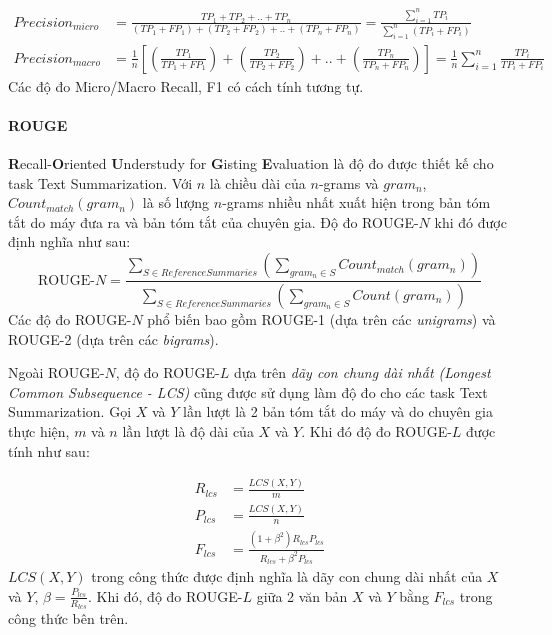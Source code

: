 \begin{equation}
\begin{aligned}
Precision_{micro} &= \frac{TP_1 + TP_2 + .. + TP_n}{(TP_1 + FP_1) + (TP_2 + FP_2) + .. + (TP_n + FP_n)} = \frac{\displaystyle\sum_{i = 1}^n TP_i}{\displaystyle\sum_{i = 1}^n (TP_i + FP_i)} \\
Precision_{macro} &= \frac{1}{n}\left[\left(\frac{TP_1}{TP_1 + FP_1}\right) + \left(\frac{TP_2}{TP_2 + FP_2}\right) + .. + \left(\frac{TP_n}{TP_n + FP_n}\right)\right] = \frac{1}{n}\sum_{i = 1}^n \frac{TP_i}{TP_i + FP_i}
\end{aligned}
\end{equation}
Các độ đo Micro/Macro Recall, F1 có cách tính tương tự.

\paragraph{ROUGE}
\textbf{R}ecall-\textbf{O}riented \textbf{U}nderstudy for \textbf{G}isting \textbf{E}valuation\cite{lin-2004-rouge} là độ đo được thiết kế cho task Text Summarization. Với $n$ là chiều dài của $n$-grams và $gram_n$, $Count_{match}(gram_n)$ là số lượng $n$-grams nhiều nhất xuất hiện trong bản tóm tắt do máy đưa ra và bản tóm tắt của chuyên gia. Độ đo ROUGE-$N$ khi đó được định nghĩa như sau:
\begin{equation}
\text{ROUGE-}N = \frac{\displaystyle\sum_{S \in {ReferenceSummaries}}\left(\sum_{gram_n \in S}Count_{match}(gram_n)\right)}{\displaystyle\sum_{S \in {ReferenceSummaries}}\left(\sum_{gram_n \in S}Count(gram_n)\right)}
\end{equation}
Các độ đo ROUGE-$N$ phổ biến bao gồm ROUGE-1 (dựa trên các \textit{unigrams}) và ROUGE-2 (dựa trên các \textit{bigrams}). 

Ngoài ROUGE-$N$, độ đo ROUGE-$L$ dựa trên \textit{dãy con chung dài nhất (Longest Common Subsequence - LCS)} cũng được sử dụng làm độ đo cho các task Text Summarization. Gọi $X$ và $Y$ lần lượt là 2 bản tóm tắt do máy và do chuyên gia thực hiện, $m$ và $n$ lần lượt là độ dài của $X$ và $Y$. Khi đó độ đo ROUGE-$L$ được tính như sau:

\begin{equation}
\begin{aligned}
R_{lcs} &= \frac{LCS(X, Y)}{m} \\
P_{lcs} &= \frac{LCS(X, Y)}{n} \\
F_{lcs} &= \frac{(1 + \beta^2)R_{lcs}P_{lcs}}{R_{lcs} + \beta^2P_{lcs}}
\end{aligned}
\end{equation}
$LCS(X, Y)$ trong công thức được định nghĩa là dãy con chung dài nhất của $X$ và $Y$, $\displaystyle \beta = \frac{P_{lcs}}{R_{lcs}}$. Khi đó, độ đo ROUGE-$L$ giữa 2 văn bản $X$ và $Y$ bằng $F_{lcs}$ trong công thức bên trên.


